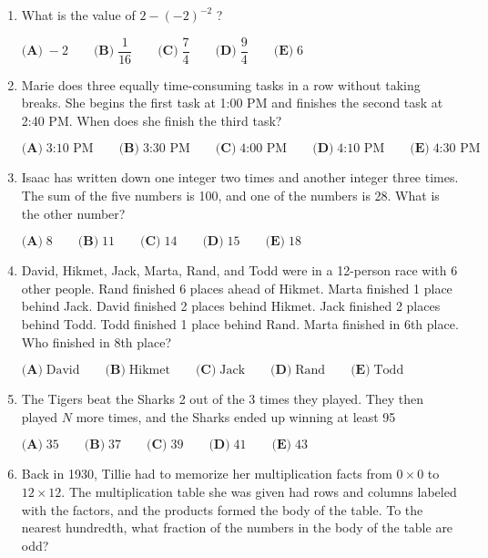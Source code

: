 \documentclass{article}
\begin{document}
\begin{enumerate}[label=\arabic*., itemsep=0.5em]\item What is the value of \(2-(-2)^{-2}\) ?

\(\textbf{(A)}\; -2 \qquad\textbf{(B)}\; \dfrac{1}{16} \qquad\textbf{(C)}\; \dfrac{7}{4} \qquad\textbf{(D)}\; \dfrac{9}{4} \qquad\textbf{(E)}\; 6\)\par \vspace{0.5em}\item Marie does three equally time-consuming tasks in a row without taking breaks. She begins the first task at 1:00 PM and finishes the second task at 2:40 PM. When does she finish the third task?

\(\textbf{(A)}\; \text{3:10 PM} \qquad\textbf{(B)}\; \text{3:30 PM} \qquad\textbf{(C)}\; \text{4:00 PM} \qquad\textbf{(D)}\; \text{4:10 PM} \qquad\textbf{(E)}\; \text{4:30 PM}\)\par \vspace{0.5em}\item Isaac has written down one integer two times and another integer three times. The sum of the five numbers is 100, and one of the numbers is 28. What is the other number?

\(\textbf{(A)}\; 8 \qquad\textbf{(B)}\; 11 \qquad\textbf{(C)}\; 14 \qquad\textbf{(D)}\; 15 \qquad\textbf{(E)}\; 18\)\par \vspace{0.5em}\item David, Hikmet, Jack, Marta, Rand, and Todd were in a 12-person race with 6 other people. Rand finished 6 places ahead of Hikmet. Marta finished 1 place behind Jack. David finished 2 places behind Hikmet. Jack finished 2 places behind Todd. Todd finished 1 place behind Rand. Marta finished in 6th place. Who finished in 8th place?

\(\textbf{(A)}\; \text{David} \qquad\textbf{(B)}\; \text{Hikmet} \qquad\textbf{(C)}\; \text{Jack} \qquad\textbf{(D)}\; \text{Rand} \qquad\textbf{(E)}\; \text{Todd}\)\par \vspace{0.5em}\item The Tigers beat the Sharks 2 out of the 3 times they played. They then played \(N\) more times, and the Sharks ended up winning at least 95%

\(\textbf{(A)}\; 35 \qquad  \textbf{(B)}\; 37 \qquad \textbf{(C)}\; 39 \qquad \textbf{(D)}\; 41 \qquad \textbf{(E)}\; 43\)\par \vspace{0.5em}\item Back in 1930, Tillie had to memorize her multiplication facts from \(0 \times 0\) to \(12 \times 12\). The multiplication table she was given had rows and columns labeled with the factors, and the products formed the body of the table. To the nearest hundredth, what fraction of the numbers in the body of the table are odd?


\end{enumerate}
\end{document}
